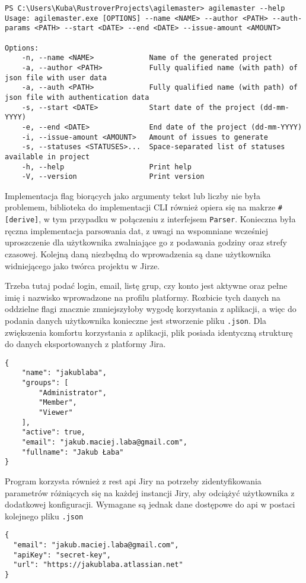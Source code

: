 \begin{lstlisting}[caption=CLI programu agilemaster]
PS C:\Users\Kuba\RustroverProjects\agilemaster> agilemaster --help
Usage: agilemaster.exe [OPTIONS] --name <NAME> --author <PATH> --auth-params <PATH> --start <DATE> --end <DATE> --issue-amount <AMOUNT>

Options:
    -n, --name <NAME>             Name of the generated project
    -a, --author <PATH>           Fully qualified name (with path) of json file with user data
    -a, --auth <PATH>             Fully qualified name (with path) of json file with authentication data
    -s, --start <DATE>            Start date of the project (dd-mm-YYYY)
    -e, --end <DATE>              End date of the project (dd-mm-YYYY)
    -i, --issue-amount <AMOUNT>   Amount of issues to generate
    -s, --statuses <STATUSES>...  Space-separated list of statuses available in project
    -h, --help                    Print help
    -V, --version                 Print version
\end{lstlisting}

Implementacja flag biorących jako argumenty tekst lub liczby nie była problemem, biblioteka do implementacji CLI również opiera się na makrze
\texttt{\#[derive]}, w tym przypadku w połączeniu z interfejsem \texttt{Parser}.
Konieczna była ręczna implementacja parsowania dat, z uwagi na wspomniane wcześniej uproszczenie dla użytkownika zwalniające go z podawania godziny oraz strefy czasowej.
Kolejną daną niezbędną do wprowadzenia są dane użytkownika widniejącego jako twórca projektu w Jirze.

Trzeba tutaj podać login, email, listę grup, czy konto jest aktywne oraz pełne imię i nazwisko wprowadzone na profilu platformy.
Rozbicie tych danych na oddzielne flagi znacznie zmniejszyłoby wygodę korzystania z aplikacji, a więc do podania danych użytkownika konieczne jest stworzenie pliku \texttt{.json}.
Dla zwiększenia komfortu korzystania z aplikacji, plik posiada identyczną strukturę do danych eksportowanych z platformy Jira.
\begin{lstlisting}[caption=Przykładowy plik z danymi użytkownika]
{
    "name": "jakublaba",
    "groups": [
        "Administrator",
        "Member",
        "Viewer"
    ],
    "active": true,
    "email": "jakub.maciej.laba@gmail.com",
    "fullname": "Jakub Łaba"
}
\end{lstlisting}

Program korzysta również z rest api Jiry na potrzeby zidentyfikowania parametrów różniących się na każdej instancji Jiry, aby odciążyć użytkownika z dodatkowej konfiguracji.
Wymagane są jednak dane dostępowe do api w postaci kolejnego pliku \texttt{.json}
\begin{lstlisting}[caption=Przykładowy plik z danymi dostępowymi do api Jiry]
{
  "email": "jakub.maciej.laba@gmail.com",
  "apiKey": "secret-key",
  "url": "https://jakublaba.atlassian.net"
}
\end{lstlisting}
